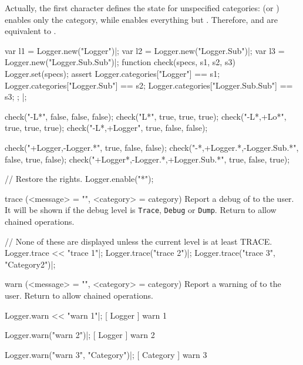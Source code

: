 \begin{urbiscriptapi}
  Actually, the first character defines the state for unspecified
  categories:  (or ) enables only the 
  category, while  enables everything but .
  Therefore,  and  are
  equivalent to .

\begin{urbiscript}
var l1 = Logger.new("Logger")|;
var l2 = Logger.new("Logger.Sub")|;
var l3 = Logger.new("Logger.Sub.Sub")|;
function check(specs, s1, s2, s3)
{
  Logger.set(specs);
  assert
  {
    Logger.categories["Logger"]         == s1;
    Logger.categories["Logger.Sub"]     == s2;
    Logger.categories["Logger.Sub.Sub"] == s3;
  };
}|;

check("-L*",      false, false, false);
check("L*",       true, true, true);
check("-L*,+Lo*", true, true, true);
check("-L*,+Logger", true, false, false);

check("+Logger,-Logger.*", true, false, false);
check("-*,+Logger.*,-Logger.Sub.*", false, true, false);
check("+Logger*,-Logger.*,+Logger.Sub.*", true, false, true);
\end{urbiscript}

\begin{urbicomment}
// Restore the rights.
Logger.enable("*");
\end{urbicomment}

\item[trace](<message> = "", <category> = category)%
  Report a debug  of  to the user. It will be
  shown if the debug level is \lstinline|Trace|, \lstinline|Debug| or
  \lstinline|Dump|. Return \this to allow chained operations.
\begin{urbiscript}
// None of these are displayed unless the current level is at least TRACE.
Logger.trace << "trace 1"|;
Logger.trace("trace 2")|;
Logger.trace("trace 3", "Category2")|;
\end{urbiscript}

\item[warn](<message> = "", <category> = category)%
  Report a warning  of  to the user. Return \this
  to allow chained operations.
\begin{urbiscript}
Logger.warn << "warn 1"|;
[       Logger        ] warn 1

Logger.warn("warn 2")|;
[       Logger        ] warn 2

Logger.warn("warn 3", "Category")|;
[       Category       ] warn 3
\end{urbiscript}
\end{urbiscriptapi}

